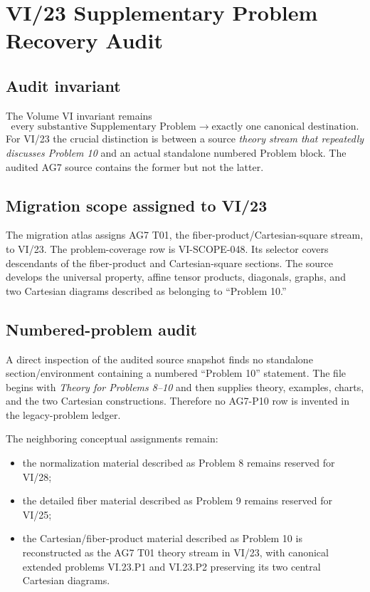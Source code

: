 \chapter*{VI/23 Supplementary Problem Recovery Audit}

\section*{Audit invariant}
The Volume VI invariant remains
\[
\boxed{\text{every substantive Supplementary Problem}\longrightarrow\text{exactly one canonical destination}.}
\]
For VI/23 the crucial distinction is between a source \emph{theory stream that repeatedly discusses
Problem 10} and an actual standalone numbered Problem block.  The audited AG7 source contains the
former but not the latter.

\section*{Migration scope assigned to VI/23}
The migration atlas assigns AG7 T01, the fiber-product/Cartesian-square stream, to VI/23.  The
problem-coverage row is VI-SCOPE-048.  Its selector covers descendants of the fiber-product
and Cartesian-square sections.  The source develops the universal property,
affine tensor products, diagonals, graphs, and two Cartesian diagrams described as belonging to
``Problem 10.''

\section*{Numbered-problem audit}
A direct inspection of the audited source snapshot finds no standalone section/environment containing
a numbered ``Problem 10'' statement.  The file begins with \emph{Theory for Problems 8--10} and then
supplies theory, examples, charts, and the two Cartesian constructions.  Therefore no AG7-P10 row is
invented in the legacy-problem ledger.

The neighboring conceptual assignments remain:
\begin{itemize}
\item the normalization material described as Problem 8 remains reserved for VI/28;
\item the detailed fiber material described as Problem 9 remains reserved for VI/25;
\item the Cartesian/fiber-product material described as Problem 10 is reconstructed as the AG7 T01
theory stream in VI/23, with canonical extended problems VI.23.P1 and VI.23.P2 preserving its two central
Cartesian diagrams.
\end{itemize}

